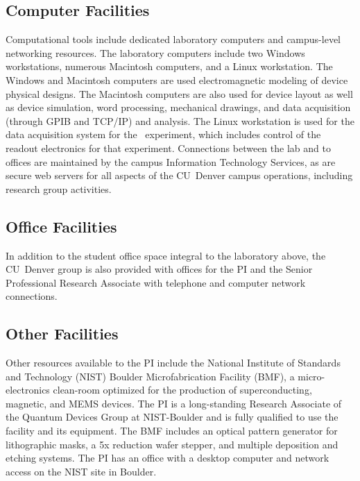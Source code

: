 %
%
%


\subsection{Computer Facilities}
 Computational tools include dedicated laboratory computers and campus-level networking resources. The laboratory computers include two Windows workstations, numerous Macintosh computers, and a Linux workstation. The Windows and Macintosh computers are used electromagnetic modeling of device physical designs. The Macintosh computers are also used for device layout as well as device simulation, word processing, mechanical drawings, and data acquisition (through GPIB and TCP/IP) and analysis. The Linux workstation is used for the data acquisition system for the \scs\ experiment, which includes control of the readout electronics for that experiment. Connections between the lab and to offices are maintained by the campus Information Technology Services, as are secure web servers for all aspects of the CU~Denver campus operations, including research group activities. %


\subsection{Office Facilities}
 In addition to the student office space integral to the laboratory above, the CU~Denver group is also provided with offices for the PI and the Senior Professional Research Associate with telephone and computer network connections. 



\subsection{Other Facilities}
 Other resources available to the PI include the National Institute of Standards and Technology (NIST) Boulder Microfabrication Facility (BMF), a micro-electronics clean-room optimized for the production of superconducting, magnetic, and MEMS devices. The PI is a long-standing Research Associate of the Quantum Devices Group at NIST-Boulder and is fully qualified to use the facility and its equipment. The BMF includes an optical pattern generator for lithographic masks, a 5x reduction wafer stepper, and multiple deposition and etching systems. The PI has an office with a desktop computer and network access on the NIST site in Boulder. %


